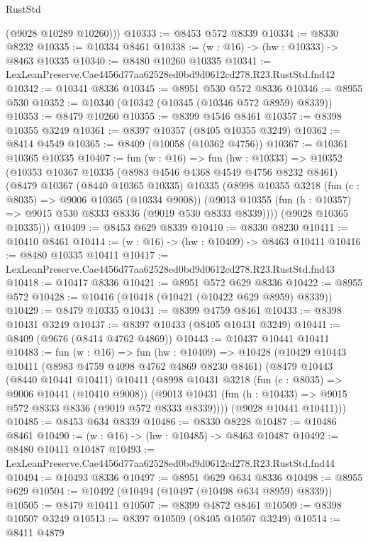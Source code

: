 \begin{lexlean}{RustStd}
\begin{coremodule}
        (@9028 @10289 @10260)))
@10333 := @8453 @572 @8339
@10334 := @8330 @8232
@10335 := @10334 @8461
@10338 := (w : @16) -> (hw : @10333) -> @8463 @10335
@10340 := @8480 @10260 @10335
@10341 := LexLeanPreserve.Cae4456d77aa62528ed0bd9d0612cd278.R23.RustStd.fnd42
@10342 := @10341 @8336
@10345 := @8951 @530 @572 @8336
@10346 := @8955 @530
@10352 := @10340 (@10342 (@10345 (@10346 @572 @8959) @8339))
@10353 := @8479 @10260
@10355 := @8399 @4546 @8461
@10357 := @8398 @10355 @3249
@10361 := @8397 @10357 (@8405 @10355 @3249)
@10362 := @8414 @4549
@10365 := @8409 (@10058 (@10362 @4756))
@10367 := @10361 @10365 @10335
@10407 := fun (w : @16) =>
  fun (hw : @10333) =>
  @10352
    (@10353
      @10367
      @10335
      (@8983 @4546 @4368 @4549 @4756 @8232 @8461)
      (@8479
        @10367
        (@8440 @10365 @10335)
        @10335
        (@8998
          @10355
          @3218
          (fun (c : @8035) => @9006 @10365 (@10334 @9008))
          (@9013 @10355 (fun (h : @10357) => @9015 @530 @8333 @8336 (@9019 @530 @8333 @8339))))
        (@9028 @10365 @10335)))
@10409 := @8453 @629 @8339
@10410 := @8330 @8230
@10411 := @10410 @8461
@10414 := (w : @16) -> (hw : @10409) -> @8463 @10411
@10416 := @8480 @10335 @10411
@10417 := LexLeanPreserve.Cae4456d77aa62528ed0bd9d0612cd278.R23.RustStd.fnd43
@10418 := @10417 @8336
@10421 := @8951 @572 @629 @8336
@10422 := @8955 @572
@10428 := @10416 (@10418 (@10421 (@10422 @629 @8959) @8339))
@10429 := @8479 @10335
@10431 := @8399 @4759 @8461
@10433 := @8398 @10431 @3249
@10437 := @8397 @10433 (@8405 @10431 @3249)
@10441 := @8409 (@9676 (@8414 @4762 @4869))
@10443 := @10437 @10441 @10411
@10483 := fun (w : @16) =>
  fun (hw : @10409) =>
  @10428
    (@10429
      @10443
      @10411
      (@8983 @4759 @4098 @4762 @4869 @8230 @8461)
      (@8479
        @10443
        (@8440 @10441 @10411)
        @10411
        (@8998
          @10431
          @3218
          (fun (c : @8035) => @9006 @10441 (@10410 @9008))
          (@9013 @10431 (fun (h : @10433) => @9015 @572 @8333 @8336 (@9019 @572 @8333 @8339))))
        (@9028 @10441 @10411)))
@10485 := @8453 @634 @8339
@10486 := @8330 @8228
@10487 := @10486 @8461
@10490 := (w : @16) -> (hw : @10485) -> @8463 @10487
@10492 := @8480 @10411 @10487
@10493 := LexLeanPreserve.Cae4456d77aa62528ed0bd9d0612cd278.R23.RustStd.fnd44
@10494 := @10493 @8336
@10497 := @8951 @629 @634 @8336
@10498 := @8955 @629
@10504 := @10492 (@10494 (@10497 (@10498 @634 @8959) @8339))
@10505 := @8479 @10411
@10507 := @8399 @4872 @8461
@10509 := @8398 @10507 @3249
@10513 := @8397 @10509 (@8405 @10507 @3249)
@10514 := @8411 @4879

\end{coremodule}
\end{lexlean}
